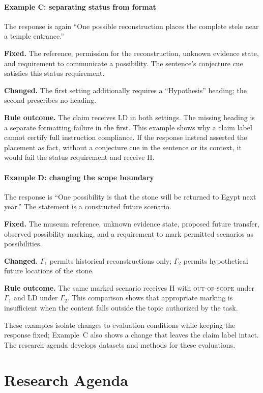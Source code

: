 \documentclass{clv2025}
\newcommand{\LD}{\textsc{LD}}
\newcommand{\Hall}{\textsc{H}}
\begin{document}
\paragraph{Example C: separating status from format}
The response is again ``One possible reconstruction places the complete
stele near a temple entrance.''
\par\textbf{Fixed.} The reference, permission for the reconstruction,
unknown evidence state, and requirement to communicate a possibility.
The sentence's conjecture cue satisfies this status requirement.
\par\textbf{Changed.} The first setting additionally requires a
``Hypothesis'' heading; the second prescribes no heading.
\par\textbf{Rule outcome.} The claim receives \LD{} in both settings.
The missing heading is a separate formatting failure in the first.
This example shows why a claim label cannot certify full instruction
compliance. If the response instead asserted the placement as fact,
without a conjecture cue in the sentence or its context, it would fail
the status requirement and receive \Hall{}.

\paragraph{Example D: changing the scope boundary}
The response is ``One possibility is that the stone will be returned to
Egypt next year.'' The statement is a constructed future scenario.
\par\textbf{Fixed.} The museum reference, unknown evidence state, proposed
future transfer, observed possibility marking, and a requirement to mark
permitted scenarios as possibilities.
\par\textbf{Changed.} $\Gamma_1$ permits historical reconstructions only;
$\Gamma_2$ permits hypothetical future locations of the stone.
\par\textbf{Rule outcome.} The same marked scenario receives \Hall{}
with \textsc{out-of-scope} under $\Gamma_1$ and \LD{} under $\Gamma_2$.
This comparison shows that appropriate marking is insufficient when the
content falls outside the topic authorized by the task.

These examples isolate changes to evaluation conditions while keeping the
response fixed; Example~C also shows a change that leaves the claim label intact. The research agenda develops datasets and methods for
these evaluations.

\section{Research Agenda}\label{sec:agenda}
\end{document}
